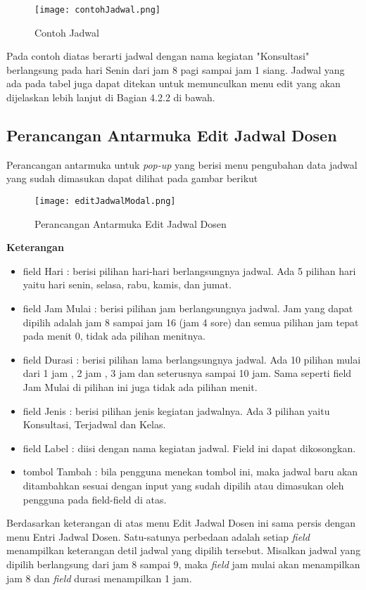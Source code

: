 \begin{enumerate}
		\begin{figure} [H]
			\centering  
			\texttt{[image: contohJadwal.png]}
			\caption[Contoh Jadwal]{Contoh Jadwal} 
			\label{fig:flow-chart-CodeIgniter} 
		\end{figure}
		Pada contoh diatas berarti jadwal dengan nama kegiatan "Konsultasi" berlangsung pada hari Senin dari jam 8 pagi sampai jam 1 siang. Jadwal yang ada pada tabel juga dapat ditekan untuk memunculkan menu edit yang akan dijelaskan lebih lanjut di Bagian 4.2.2 di bawah.
\end{enumerate}
\subsection{Perancangan Antarmuka Edit Jadwal Dosen}
Perancangan antarmuka untuk \textit{pop-up} yang berisi menu pengubahan data jadwal yang sudah dimasukan dapat dilihat pada gambar berikut
\begin{figure} [H]
	\centering  
	\texttt{[image: editJadwalModal.png]}
	\caption[Perancangan Antarmuka Edit Jadwal Dosen]{Perancangan Antarmuka Edit Jadwal Dosen} 
	\label{fig:flow-chart-CodeIgniter} 
\end{figure}
\textbf{Keterangan}
\begin{itemize}
		\item field Hari : berisi pilihan hari-hari berlangsungnya jadwal. Ada 5 pilihan hari yaitu hari senin, selasa, rabu, kamis, dan jumat.
		\item field Jam Mulai : berisi pilihan jam berlangsungnya jadwal. Jam yang dapat dipilih adalah jam 8 sampai jam 16 (jam 4 sore) dan semua 		pilihan jam tepat pada menit 0, tidak ada pilihan menitnya.
		\item field Durasi : berisi pilihan lama berlangsungnya jadwal. Ada 10 pilihan mulai dari 1 jam , 2 jam , 3 jam dan seterusnya sampai 10 			jam. Sama seperti field Jam Mulai di pilihan ini juga tidak ada pilihan menit.
		\item field Jenis : berisi pilihan jenis kegiatan jadwalnya. Ada 3 pilihan yaitu Konsultasi, Terjadwal dan Kelas.
		\item field Label : diisi dengan nama kegiatan jadwal. Field ini dapat dikosongkan.
		\item tombol Tambah : bila pengguna menekan tombol ini, maka jadwal baru akan ditambahkan sesuai dengan input yang sudah dipilih atau dimasukan oleh pengguna pada field-field di atas.
	\end{itemize}
Berdasarkan keterangan di atas menu Edit Jadwal Dosen ini sama persis dengan menu Entri Jadwal Dosen. Satu-satunya perbedaan adalah setiap \textit{field} menampilkan keterangan detil jadwal yang dipilih tersebut. Misalkan jadwal yang dipilih berlangsung dari jam 8 sampai 9, maka \textit{field} jam mulai akan menampilkan jam 8 dan \textit{field} durasi menampilkan 1 jam.

